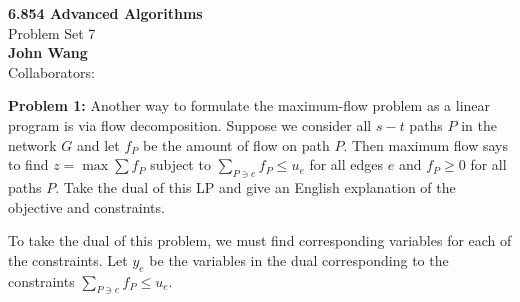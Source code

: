 \documentclass[psamsfonts]{amsart}
\newenvironment{sol}{\vspace{0.25cm}{\large \bfseries Solution:}}{\qedsymbol}
\newenvironment{prob}[1]{\begin{framed}{\large \bfseries Problem #1:}}{\end{framed}}
\newcommand{\makenewtitle}{
    \begin{center}
    {\huge \bfseries 6.854 Advanced Algorithms} \\
    Problem Set 7\\
    \vspace{0.25cm}
    {\bfseries John Wang} \\
    Collaborators: 
    \end{center}
    \vspace{0.5cm}
}
\begin{document}
\makenewtitle

\begin{prob}{1}
Another way to formulate the maximum-flow problem as a linear program is via flow decomposition. Suppose we consider all $s-t$ paths $P$ in the network $G$ and let $f_P$ be the amount of flow on path $P$. Then maximum flow says to find $z = \max \sum f_P$ subject to $\sum_{P \ni e} f_P \leq u_e$ for all edges $e$ and $f_P \geq 0$ for all paths $P$. Take the dual of this LP and give an English explanation of the objective and constraints.
\end{prob}

\begin{sol}
To take the dual of this problem, we must find corresponding variables for each of the constraints. Let $y_{e}$ be the variables in the dual corresponding to the constraints $\sum_{P \ni e} f_P \leq u_e$.
\end{sol}
\end{document}
